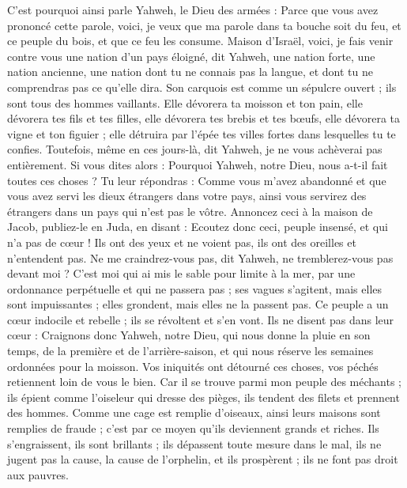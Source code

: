 \begin{multicols}{2}
C'est pourquoi ainsi parle Yahweh, le Dieu des armées : Parce que vous avez prononcé cette parole, voici, je veux que ma parole dans ta bouche soit du feu, et ce peuple du bois, et que ce feu les consume.
Maison d'Israël, voici, je fais venir contre vous une nation d'un pays éloigné, dit Yahweh, une nation forte, une nation ancienne, une nation dont tu ne connais pas la langue, et dont tu ne comprendras pas ce qu'elle dira.
Son carquois est comme un sépulcre ouvert ; ils sont tous des hommes vaillants.
Elle dévorera ta moisson et ton pain, elle dévorera tes fils et tes filles, elle dévorera tes brebis et tes bœufs, elle dévorera ta vigne et ton figuier ; elle détruira par l'épée tes villes fortes dans lesquelles tu te confies.
Toutefois, même en ces jours-là, dit Yahweh, je ne vous achèverai pas entièrement.
Si vous dites alors : Pourquoi Yahweh, notre Dieu, nous a-t-il fait toutes ces choses ? Tu leur répondras : Comme vous m'avez abandonné et que vous avez servi les dieux étrangers dans votre pays, ainsi vous servirez des étrangers dans un pays qui n'est pas le vôtre.
Annoncez ceci à la maison de Jacob, publiez-le en Juda, en disant :
Ecoutez donc ceci, peuple insensé, et qui n'a pas de cœur ! Ils ont des yeux et ne voient pas, ils ont des oreilles et n'entendent pas.
Ne me craindrez-vous pas, dit Yahweh, ne tremblerez-vous pas devant moi ? C’est moi qui ai mis le sable pour limite à la mer, par une ordonnance perpétuelle et qui ne passera pas ; ses vagues s’agitent, mais elles sont impuissantes ; elles grondent, mais elles ne la passent pas.
Ce peuple a un cœur indocile et rebelle ; ils se révoltent et s'en vont.
Ils ne disent pas dans leur cœur : Craignons donc Yahweh, notre Dieu, qui nous donne la pluie en son temps, de la première et de l’arrière-saison, et qui nous réserve les semaines ordonnées pour la moisson.
Vos iniquités ont détourné ces choses, vos péchés retiennent loin de vous le bien.
Car il se trouve parmi mon peuple des méchants ; ils épient comme l’oiseleur qui dresse des pièges, ils tendent des filets et prennent des hommes.
Comme une cage est remplie d'oiseaux, ainsi leurs maisons sont remplies de fraude ; c’est par ce moyen qu’ils deviennent grands et riches.
Ils s’engraissent, ils sont brillants ; ils dépassent toute mesure dans le mal, ils ne jugent pas la cause, la cause de l'orphelin, et ils prospèrent ; ils ne font pas droit aux pauvres.

\end{multicols}
